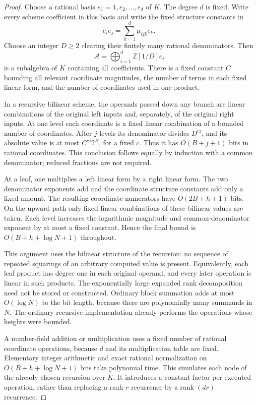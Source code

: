 \begin{proof}
Choose a rational basis $e_1=1,e_2,\ldots,e_d$ of $K$. The degree $d$ is
fixed. Write every scheme coefficient in this basis and write the fixed
structure constants in
\[
 e_i e_j=\sum_{k=1}^{d}\mu_{ijk}e_k.
\]
Choose an integer $D\geq2$ clearing their finitely many rational
denominators. Then
\[
 \mathcal A=\bigoplus_{i=1}^{d}\mathbb Z[1/D]e_i
\]
is a subalgebra of $K$ containing all coefficients. There is a fixed
constant $C$ bounding all relevant coordinate magnitudes, the number of
terms in each fixed linear form, and the number of coordinates used in
one product.

In a recursive bilinear scheme, the operands passed down any branch are
linear combinations of the original left inputs and, separately, of the
original right inputs. At one level each coordinate is a fixed linear
combination of a bounded number of coordinates. After $j$ levels its
denominator divides $D^{c j}$, and its absolute value is at most
$C^{c j}2^B$, for a fixed $c$. Thus it has $O(B+j+1)$ bits in rational
coordinates. This conclusion follows equally by induction with a common
denominator; reduced fractions are not required.

At a leaf, one multiplies a left linear form by a right linear form.
The two denominator exponents add and the coordinate structure constants
add only a fixed amount. The resulting coordinate numerators have
$O(2B+h+1)$ bits. On the upward path only fixed linear combinations of
these bilinear values are taken. Each level increases the logarithmic
magnitude and common-denominator exponent by at most a fixed constant.
Hence the final bound is $O(B+h+\log N+1)$ throughout.

This argument uses the bilinear structure of the recursion: no sequence
of repeated squarings of an arbitrary computed value is present.
Equivalently, each leaf product has degree one in each original operand,
and every later operation is linear in such products. The exponentially
large expanded rank decomposition need not be stored or constructed.
Ordinary block summation adds at most $O(\log N)$ to the bit length, because there are polynomially many summands in $N$. The ordinary recursive implementation already performs the operations
whose heights were bounded.

A number-field addition or multiplication uses a fixed number of rational
coordinate operations, because $d$ and its multiplication table are fixed.
Elementary integer arithmetic and exact rational normalization on
$O(B+h+\log N+1)$ bits take polynomial time. This simulates each node of the
already chosen recursion over $K$. It introduces a constant factor per
executed operation, rather than replacing a rank-$r$ recurrence by a
rank-$(d r)$ recurrence.
\end{proof}

